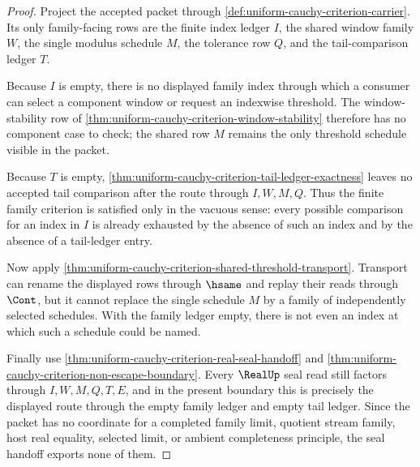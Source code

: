 \begin{proof}
Project the accepted packet through \autoref{def:uniform-cauchy-criterion-carrier}. Its only family-facing rows are the finite index ledger $I$, the shared window family $W$, the single modulus schedule $M$, the tolerance row $Q$, and the tail-comparison ledger $T$.

Because $I$ is empty, there is no displayed family index through which a consumer can select a component window or request an indexwise threshold. The window-stability row of \autoref{thm:uniform-cauchy-criterion-window-stability} therefore has no component case to check; the shared row $M$ remains the only threshold schedule visible in the packet.

Because $T$ is empty, \autoref{thm:uniform-cauchy-criterion-tail-ledger-exactness} leaves no accepted tail comparison after the route through $I,W,M,Q$. Thus the finite family criterion is satisfied only in the vacuous sense: every possible comparison for an index in $I$ is already exhausted by the absence of such an index and by the absence of a tail-ledger entry.

Now apply \autoref{thm:uniform-cauchy-criterion-shared-threshold-transport}. Transport can rename the displayed rows through $\hsame$ and replay their reads through $\Cont$, but it cannot replace the single schedule $M$ by a family of independently selected schedules. With the family ledger empty, there is not even an index at which such a schedule could be named.

Finally use \autoref{thm:uniform-cauchy-criterion-real-seal-handoff} and \autoref{thm:uniform-cauchy-criterion-non-escape-boundary}. Every $\RealUp$ seal read still factors through $I,W,M,Q,T,E$, and in the present boundary this is precisely the displayed route through the empty family ledger and empty tail ledger. Since the packet has no coordinate for a completed family limit, quotient stream family, host real equality, selected limit, or ambient completeness principle, the seal handoff exports none of them.
\end{proof}

